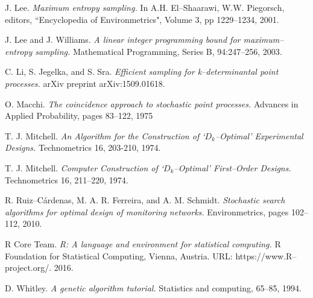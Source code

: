 \documentclass[]{interact}
\theoremstyle{plain}%
\theoremstyle{definition}
\theoremstyle{remark}
\begin{document}
\begin{thebibliography}{99}
J. Lee. {\em Maximum entropy sampling.} In A.H. El--Shaarawi, W.W. Piegorsch, editors, ``Encyclopedia of Environmetrics", Volume 3, pp 1229--1234, 2001.

J. Lee and J. Williams. {\em A linear integer programming bound for maximum--entropy sampling.} Mathematical Programming, Series B, 94:247--256, 2003.

C. Li, S. Jegelka, and S. Sra. {\em Efficient sampling for k--determinantal point processes.} arXiv preprint arXiv:1509.01618.

O. Macchi. {\em The coincidence approach to stochastic point processes.} Advances in Applied Probability, pages 83–122, 1975

T. J. Mitchell. {\em An Algorithm for the Construction of `$D_k$--Optimal' Experimental Designs.} Technometrics 16, 203-210, 1974.

T. J. Mitchell. {\em Computer Construction of `$D_k$--Optimal' First--Order Designs.} Technometrics 16, 211--220, 1974.

R. Ruiz--Cárdenas, M. A. R. Ferreira, and A. M. Schmidt. {\em Stochastic search algorithms for optimal design of monitoring networks.} Environmetrics, pages 102--112, 2010.

R Core Team. {\em R: A language and environment for statistical computing.} R
  Foundation for Statistical Computing, Vienna, Austria. URL: https://www.R--project.org/. 2016.
  
D. Whitley. {\em A genetic algorithm tutorial.} Statistics and computing, 65--85, 1994.  

\end{thebibliography}
\end{document}

